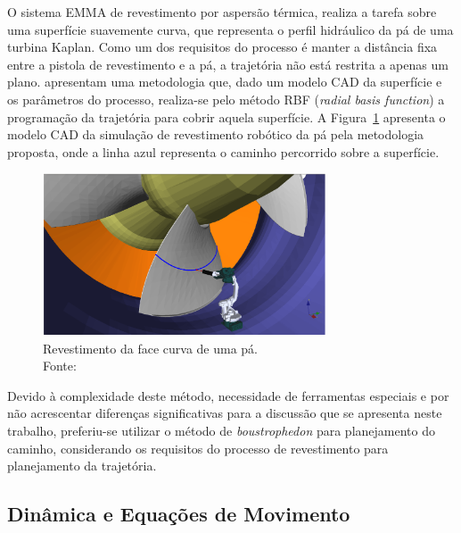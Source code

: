 
O sistema EMMA de revestimento por aspersão térmica, realiza a tarefa sobre uma
superfície suavemente curva, que representa o perfil hidráulico da pá de uma
turbina Kaplan. Como um dos requisitos do processo é manter a distância fixa
entre a pistola de revestimento e a pá, a trajetória não está restrita a apenas
um plano. \citet{8206216} apresentam uma metodologia que, dado um modelo CAD da
superfície e os parâmetros do processo, realiza-se pelo método RBF
(\textit{radial basis function}) a programação da trajetória para cobrir aquela
superfície. A Figura~\ref{fig::coat_blade} apresenta o modelo CAD da simulação
de revestimento robótico da pá pela metodologia proposta, onde a linha azul
representa o caminho percorrido sobre a superfície.

\begin{figure}[h]
	\centering 
 	\includegraphics[width=0.75\textwidth]{figs/coat_blade}
 	\caption[Revestimento da face curva de uma pá]{Revestimento da face curva de
 	uma pá. \\Fonte: \citet{8206216}}
 	\label{fig::coat_blade}
\end{figure}

Devido à complexidade deste método, necessidade de ferramentas especiais e por
não acrescentar diferenças significativas para a discussão que se apresenta
neste trabalho, preferiu-se utilizar o método de \textit{boustrophedon} para
planejamento do caminho, considerando os requisitos do processo de revestimento
para planejamento da trajetória.



\subsection{Dinâmica e Equações de Movimento}

